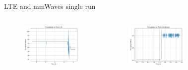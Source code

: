 \documentclass{beamer}
\begin{document}
	\begin{frame}{LTE and mmWaves single run}
		\begin{columns}
				\begin{figure}
					\vspace{-0.2in}
					\includegraphics[scale=0.32]{throughput_lte_UDP}
				\end{figure}
				\begin{figure}
					\vspace{-0.3in}
					\includegraphics[scale=0.32]{throughput_mmWaves_UDP}
				\end{figure}
				\begin{figure}
					\vspace{-0.2in}

\end{figure}
\end{columns}
\end{frame}
\end{document}
